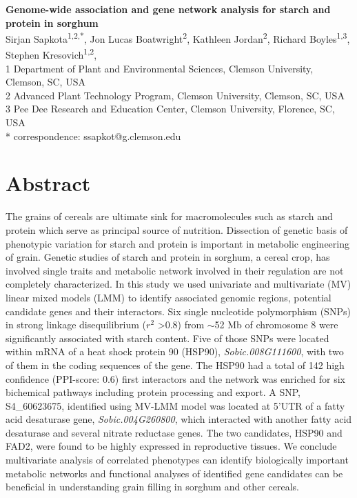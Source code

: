 \documentclass[10pt,letterpaper]{article}
\begin{document}
\vspace*{0.35in}
\justify

\pagestyle{empty} %
\begin{flushleft}
{\Large
\textbf{Genome-wide association and gene network analysis for starch and protein in sorghum}
}
\doublespacing
\newline
\\
Sirjan Sapkota\textsuperscript{1,2,*},
Jon Lucas Boatwright\textsuperscript{2},
Kathleen Jordan\textsuperscript{2},
Richard Boyles\textsuperscript{1,3},
Stephen Kresovich\textsuperscript{1,2},
\\
\bigskip
{1} Department of Plant and Environmental Sciences, Clemson University, Clemson, SC, USA
\\
{2} Advanced Plant Technology Program, Clemson University, Clemson, SC, USA
\\
{3} Pee Dee Research and Education Center, Clemson University, Florence, SC, USA
\\
\bigskip
* correspondence: ssapkot@g.clemson.edu

\end{flushleft}
\doublespacing
\section*{Abstract}
The grains of cereals are ultimate sink for macromolecules such as starch and protein which serve as principal source of nutrition. Dissection of genetic basis of phenotypic variation for starch and protein is important in metabolic engineering of grain. Genetic studies of starch and protein in sorghum, a cereal crop, has involved single traits and metabolic network involved in their regulation are not completely characterized. In this study we used univariate and multivariate (MV) linear mixed models (LMM) to identify associated genomic regions, potential candidate genes and their interactors. Six single nucleotide polymorphism (SNPs) in strong linkage disequilibrium ($r^2$ \textgreater 0.8) from $\sim$52 Mb of chromosome 8 were significantly associated with starch content. Five of those SNPs were located within mRNA of a heat shock protein 90 (HSP90), \textit{Sobic.008G111600}, with two of them in the coding sequences of the gene. The HSP90 had a total of 142 high confidence (PPI-score: 0.6) first interactors and the network was enriched for six bichemical pathways including protein processing and export. A SNP, S4\_60623675, identified using MV-LMM model was located at 5'UTR of a fatty acid desaturase gene, \textit{Sobic.004G260800}, which interacted with another fatty acid desaturase and several nitrate reductase genes. The two candidates, HSP90 and FAD2, were found to be highly expressed in reproductive tissues. We conclude multivariate analysis of correlated phenotypes can identify biologically important metabolic networks and functional analyses of identified gene candidates can be beneficial in understanding grain filling in sorghum and other cereals.
\end{document}
